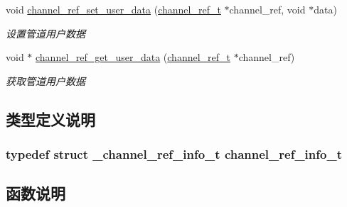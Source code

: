 \begin{DoxyCompactItemize}
void \hyperlink{a00101_ga92427ed1f084e9b019acfcdf79bb4b44_ga92427ed1f084e9b019acfcdf79bb4b44}{channel\+\_\+ref\+\_\+set\+\_\+user\+\_\+data} (\hyperlink{a00050_a151271c9d188ef28d4d24bb81dcc1263_a151271c9d188ef28d4d24bb81dcc1263}{channel\+\_\+ref\+\_\+t} $\ast$channel\+\_\+ref, void $\ast$data)
\begin{DoxyCompactList}\small\item\em 设置管道用户数据 \end{DoxyCompactList}\item 
void $\ast$ \hyperlink{a00101_gaf4021842b995f59d23b931dd9ad3ff07_gaf4021842b995f59d23b931dd9ad3ff07}{channel\+\_\+ref\+\_\+get\+\_\+user\+\_\+data} (\hyperlink{a00050_a151271c9d188ef28d4d24bb81dcc1263_a151271c9d188ef28d4d24bb81dcc1263}{channel\+\_\+ref\+\_\+t} $\ast$channel\+\_\+ref)
\begin{DoxyCompactList}\small\item\em 获取管道用户数据 \end{DoxyCompactList}\end{DoxyCompactItemize}


\subsection{类型定义说明}
\hypertarget{a00047_a3c8048d6abb647710be83f9b243c7822_a3c8048d6abb647710be83f9b243c7822}{}
\subsubsection[{channel\+\_\+ref\+\_\+info\+\_\+t}]{\setlength{\rightskip}{0pt plus 5cm}typedef struct {\bf \+\_\+channel\+\_\+ref\+\_\+info\+\_\+t}  {\bf channel\+\_\+ref\+\_\+info\+\_\+t}}\label{a00047_a3c8048d6abb647710be83f9b243c7822_a3c8048d6abb647710be83f9b243c7822}


\subsection{函数说明}
\hypertarget{a00101_gae9ae0ae2a42eabf6a544ce4e0f001c9e_gae9ae0ae2a42eabf6a544ce4e0f001c9e}{}
